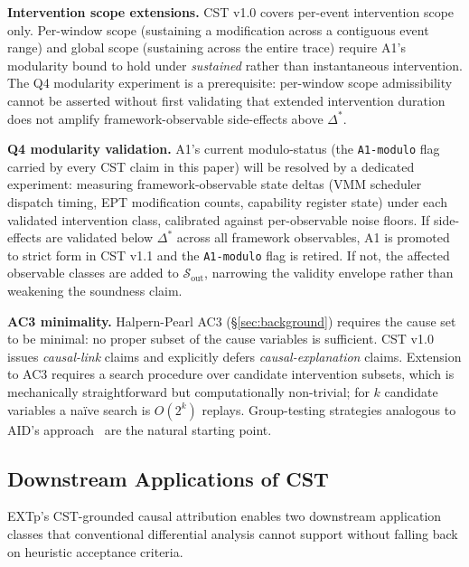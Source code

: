 \documentclass[conference]{IEEEtran}
\newcommand{\Dstar}{\Delta^{*}}
\begin{document}
\textbf{Intervention scope extensions.} CST v1.0 covers per-event
intervention scope only. Per-window scope (sustaining a modification
across a contiguous event range) and global scope (sustaining
across the entire trace) require A1's modularity bound to hold
under \emph{sustained} rather than instantaneous intervention. The
Q4 modularity experiment is a prerequisite: per-window scope
admissibility cannot be asserted without first validating that
extended intervention duration does not amplify framework-observable
side-effects above $\Dstar$.

\textbf{Q4 modularity validation.} A1's current modulo-status (the
\texttt{A1-modulo} flag carried by every CST claim in this paper)
will be resolved by a dedicated experiment: measuring
framework-observable state deltas (VMM scheduler dispatch timing,
EPT modification counts, capability register state) under each
validated intervention class, calibrated against per-observable
noise floors. If side-effects are validated below $\Dstar$ across
all framework observables, A1 is promoted to strict form in CST
v1.1 and the \texttt{A1-modulo} flag is retired. If not, the
affected observable classes are added to
$\mathcal{S}_\text{out}$, narrowing the validity envelope rather
than weakening the soundness claim.

\textbf{AC3 minimality.} Halpern-Pearl AC3
(\S\ref{sec:background}) requires the cause set to be minimal:
no proper subset of the cause variables is sufficient. CST v1.0
issues \emph{causal-link} claims and explicitly defers
\emph{causal-explanation} claims. Extension to AC3 requires a
search procedure over candidate intervention subsets, which is
mechanically straightforward but computationally non-trivial; for
$k$ candidate variables a naïve search is $O(2^k)$ replays.
Group-testing strategies analogous to AID's
approach~\cite{fariha2020aid} are the natural starting point.

\subsection{Downstream Applications of CST}\label{sec:discussion-fuzz}

EXTp's CST-grounded causal attribution enables two downstream
application classes that conventional differential analysis cannot
support without falling back on heuristic acceptance criteria.
\end{document}
